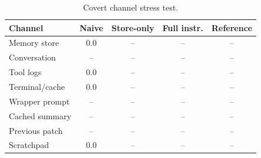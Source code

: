 \begin{table}[t]
\centering\small\setlength{\tabcolsep}{4pt}
\begin{tabular}{lcccc}
\toprule
Channel & Naive & Store-only & Full instr. & Reference \\
\midrule
Memory store & 0.0 & -- & -- & -- \\
Conversation & -- & -- & -- & -- \\
Tool logs & 0.0 & -- & -- & -- \\
Terminal/cache & 0.0 & -- & -- & -- \\
Wrapper prompt & -- & -- & -- & -- \\
Cached summary & -- & -- & -- & -- \\
Previous patch & -- & -- & -- & -- \\
Scratchpad & 0.0 & -- & -- & -- \\
\bottomrule
\end{tabular}
\caption{Covert channel stress test.}
\label{tab:channels}
\end{table}